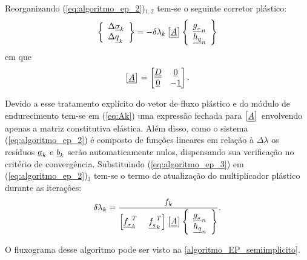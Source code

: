 Reorganizando (\ref{eq:algoritmo_ep_2})$_{1,2}$ tem-se o seguinte corretor plástico:
\begin{equation}
	\label{eq:algoritmo_ep_3}
	\left\{
	\begin{array}{lcl}
		\Delta \underline \sigma_k \\
		\Delta \underline q_k
	\end{array}
	\right\} = -\delta\lambda_k \left[ \underline{\underline A} \right]
	\left\{	
	\begin{array}{lcl}
		\underline{g_{_\sigma}}_n \\
		\underline{h_q}_n
	\end{array}
	\right\}
\end{equation}
em que
\begin{equation}
	\label{eq:Ak}
	\left[ \underline{\underline A} \right] =
	\begin{bmatrix}
		\underline{\underline D} & \underline{0} \\
		\underline{0} & -\underline{1}
	\end{bmatrix}.
\end{equation}

Devido a esse tratamento explícito do vetor de fluxo plástico e do módulo de endurecimento tem-se em (\ref{eq:Ak}) uma expressão fechada para $\left[\underline{\underline A} \right]$ envolvendo apenas a matriz constitutiva elástica. Além disso, como o sistema (\ref{eq:algoritmo_ep_2}) é composto de funções lineares em relação à $\Delta \lambda$ os resíduos $\underline{a}_k$ e $\underline{b}_k$ serão automaticamente nulos, dispensando sua verificação no critério de convergência. Substituindo (\ref{eq:algoritmo_ep_3}) em (\ref{eq:algoritmo_ep_2})$_3$ tem-se o termo de atualização do multiplicador plástico durante as iterações:
\begin{equation}
	\label{eq:deltalambdak}
	\delta \lambda_k = \dfrac{f_k}{\left[\underline{f_{_\sigma}}_k^T~~~~\underline{f_{_q}}_k^T\right]\left[\underline{\underline A} \right]\left\{ 
	\begin{array}{lcl}
			\underline{g_{_\sigma}}_n \\ 
			\underline{h_q}_n
	\end{array}\right\}}.
\end{equation}

O fluxograma desse algoritmo pode ser visto na \autoref{algoritmo_EP_semiimplicito}.

